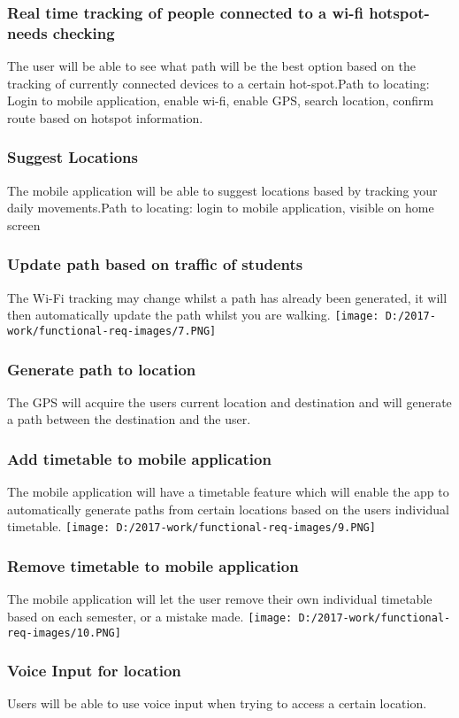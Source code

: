 \documentclass{article}
\begin{document}
\begin{center}
\subsubsection{Real time tracking of people connected to a wi-fi hotspot-needs checking}
The user will be able to see what path will be the best option based on the tracking of currently connected devices to a certain hot-spot.Path to locating: Login to mobile application, enable wi-fi, enable GPS, search location, confirm route based on hotspot information.
\newpage
\subsubsection{Suggest Locations}
The mobile application will be able to suggest locations based by tracking your daily movements.Path to locating: login to mobile application, visible on home screen
\subsubsection{Update path based on traffic of students}
The Wi-Fi tracking may change whilst a path has already been generated, it will then automatically update the path whilst you are walking.
\texttt{[image: D:/2017-work/functional-req-images/7.PNG]}
\newpage
\subsubsection{Generate path to location}
The GPS will acquire the users current location and destination and will generate a path between the destination and the user.

\subsubsection{Add timetable to mobile application}
The mobile application will have a timetable feature which will enable the app to automatically generate paths from certain locations based on the users individual timetable. 
\texttt{[image: D:/2017-work/functional-req-images/9.PNG]}
\newpage
\subsubsection{Remove timetable to mobile application}
The mobile application will let the user remove their own individual timetable based on each semester, or a mistake made.
\texttt{[image: D:/2017-work/functional-req-images/10.PNG]}
\newpage
\subsubsection{Voice Input for location}
Users will be able to use voice input when trying to access a certain location.

\end{center}
\end{document}
